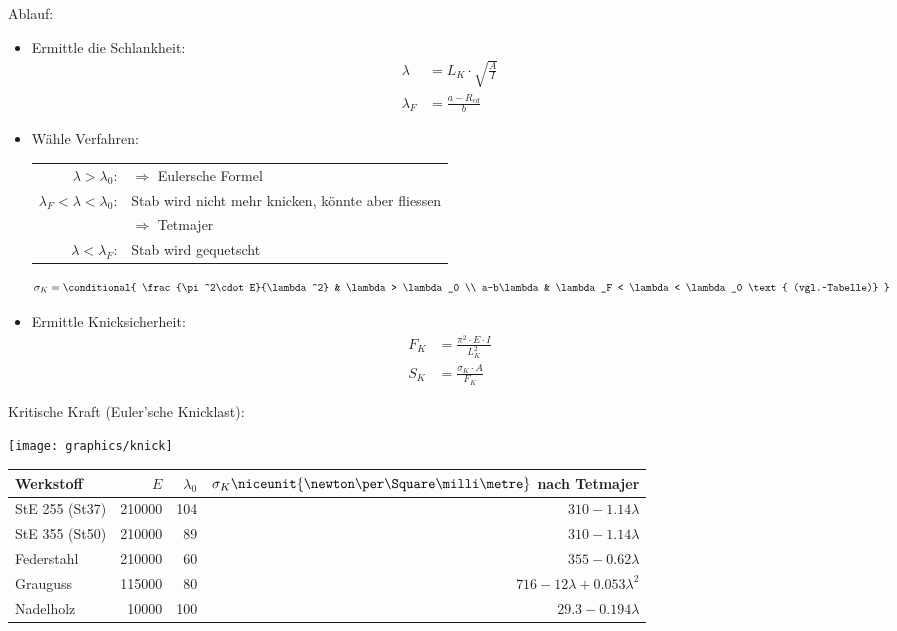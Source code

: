 	Ablauf:
	\begin{itemize}
		\item Ermittle die Schlankheit:
			\begin{align*}
				\lambda &= L_K \cdot \sqrt{\frac{A}{I}} \\
				\lambda_F &= \frac{a - R_{ed}}{b}
			\end{align*}
		\item Wähle Verfahren: \\
			\begin{tabular}{rp{5cm}}
				$\lambda > \lambda_0$: & $\Rightarrow$ Eulersche Formel \\
				$\lambda_F < \lambda < \lambda_0$: & Stab wird nicht mehr knicken, könnte aber fliessen \\[-.5ex] &
				$\Rightarrow$ Tetmajer \\
				$\lambda < \lambda_F$: & Stab wird gequetscht
			\end{tabular}
			
			\begin{equation*}
				\sigma_K = \conditional{
					\frac{\pi^2\cdot E}{\lambda^2} & \lambda > \lambda_0 \\
					a-b\lambda & \lambda_F < \lambda < \lambda_0 \text{ (vgl.~Tabelle)}
				}
			\end{equation*}
		\item Ermittle Knicksicherheit:
			\begin{align*}
				F_K &= \frac{\pi^2\cdot E \cdot I}{L_K^2} \\
				S_K &= \frac{\sigma_K \cdot A}{F_K}
			\end{align*}
	\end{itemize}

	Kritische Kraft (Euler'sche Knicklast):
	
	\texttt{[image: graphics/knick]}
	
	\begin{center}
		\begin{tabular}{lrrr}
			\toprule
			Werkstoff & $E$ & $\lambda_0$ & $\sigma_K \niceunit{\newton\per\Square\milli\metre}$ nach Tetmajer \\
			\midrule
			StE 255 (St37) & 210000 & 104 & $310 - 1.14\lambda$ \\
			StE 355 (St50) & 210000 & 89 & $310 -1.14\lambda$\\
			Federstahl & 210000 & 60 &$355 - 0.62\lambda$\\
			Grauguss & 115000 & 80 & $716 - 12\lambda + 0.053 \lambda^2$\\
			Nadelholz & 10000 & 100 & $29.3 - 0.194\lambda$\\
			\bottomrule
		\end{tabular}
	\end{center}
